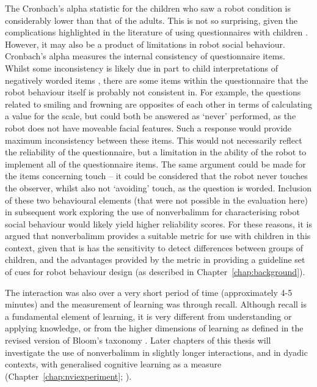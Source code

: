 The Cronbach's alpha statistic for the children who saw a robot condition is considerably lower than that of the adults. This is not so surprising, given the complications highlighted in the literature of using questionnaires with children \citep{borgers2000children}. However, it may also be a product of limitations in robot social behaviour. Cronbach's alpha measures the internal consistency of questionnaire items. Whilst some inconsistency is likely due in part to child interpretations of negatively worded items \citep{borgers2004response}, there are some items within the questionnaire that the robot behaviour itself is probably not consistent in. For example, the questions related to smiling and frowning are opposites of each other in terms of calculating a value for the scale, but could both be answered as `never' performed, as the robot does not have moveable facial features. Such a response would provide maximum inconsistency between these items. This would not necessarily reflect the reliability of the questionnaire, but a limitation in the ability of the robot to implement all of the questionnaire items. The same argument could be made for the items concerning touch -- it could be considered that the robot never touches the observer, whilst also not `avoiding' touch, as the question is worded. Inclusion of these two behavioural elements (that were not possible in the evaluation here) in subsequent work exploring the use of \gls{nonverbalimm} for characterising robot social behaviour would likely yield higher reliability scores. For these reasons, it is argued that \gls{nonverbalimm} provides a suitable metric for use with children in this context, given that is has the sensitivity to detect differences between groups of children, and the advantages provided by the metric in providing a guideline set of cues for robot behaviour design (as described in Chapter~\ref{chap:background}).

The interaction was also over a very short period of time (approximately 4-5 minutes) and the measurement of learning was through recall. Although recall is a fundamental element of learning, it is very different from understanding or applying knowledge, or from the higher dimensions of learning as defined in the revised version of Bloom's taxonomy \citep{krathwohl2002revision}. Later chapters of this thesis will investigate the use of \gls{nonverbalimm} in slightly longer interactions, and in dyadic contexts, with generalised cognitive learning as a measure (Chapter~\ref{chap:nviexperiment}; \citealp{kennedy2015higher}).

